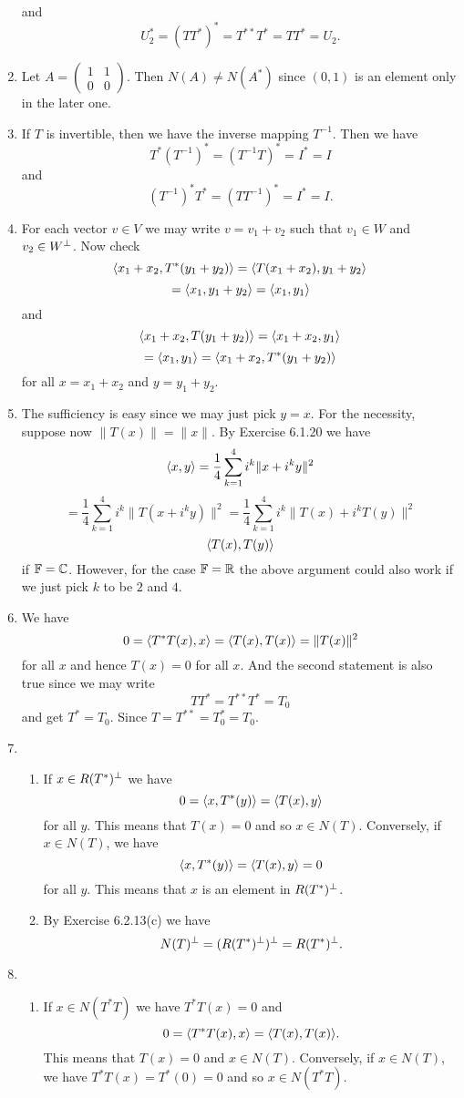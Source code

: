 \begin{enumerate}
and 
\[U_2^*=(TT^*)^*=T^{**}T^*=TT^*=U_2.\]
\item Let $A=\begin{pmatrix}1&1\\0&0\end{pmatrix}$. Then $N(A)\neq N(A^*)$ since $(0,1)$ is an element only in the later one.
\item If $T$ is invertible, then we have the inverse mapping $T^{-1}$. Then we have 
\[
    T^*(T^{-1})^*=(T^{-1}T)^*=I^*=I
\]
and  
\[
    (T^{-1})^*T^*=(TT^{-1})^*=I^*=I.
\]
\item For each vector $v\in V$ we may write $v=v_1+v_2$ such that $v_1\in W$ and $v_2\in W^{\perp}$. Now check 
\[\langle x_1+x_2,T^*(y_1+y_2)\rangle =\langle T(x_1+x_2),y_1+y_2\rangle \]
\[=\langle x_1,y_1+y_2\rangle =\langle x_1,y_1 \rangle \]
and 
\[\langle x_1+x_2,T(y_1+y_2)\rangle =\langle x_1+x_2,y_1\rangle \]
\[=\langle x_1,y_1\rangle =\langle x_1+x_2,T^*(y_1+y_2)\rangle \]
for all $x=x_1+x_2$ and $y=y_1+y_2$.
\item The sufficiency is easy since we may just pick $y=x$. For the necessity, suppose now $\|T(x)\|=\|x\|$. By Exercise 6.1.20 we have 
\[\langle x,y\rangle =\frac{1}{4}\sum_{k=1}^4{i^k\|x+i^ky\|^2}\]
\[=\frac{1}{4}\sum_{k=1}^4{i^k\|T(x+i^ky)\|^2}=\frac{1}{4}\sum_{k=1}^4{i^k\|T(x)+i^kT(y)\|^2}\]
\[\langle T(x),T(y)\rangle \]
if $\mathbb{F}=\mathbb{C}$. However, for the case $\mathbb{F}=\mathbb{R}$ the above argument could also work if we just pick $k$ to be $2$ and $4$.
\item We have 
\[0=\langle T^*T(x),x\rangle =\langle T(x),T(x)\rangle =\|T(x)\|^2\]
for all $x$ and hence $T(x)=0$ for all $x$. And the second statement is also true since we may write 
\[TT^*=T^{**}T^*=T_0\]
and get $T^*=T_0$. Since $T=T^{**}=T_0^*=T_0$.
\item \begin{enumerate}
\item If $x\in R(T^*)^{\perp}$ we have 
\[0=\langle x,T^*(y)\rangle =\langle T(x),y\rangle \]
for all $y$. This means that $T(x)=0$ and so $x\in N(T)$. Conversely, if $x\in N(T)$, we have 
\[\langle x,T^*(y)\rangle =\langle T(x),y\rangle =0\]
for all $y$. This means that $x$ is an element in $R(T^*)^{\perp}$.
\item By Exercise 6.2.13(c) we have 
\[N(T)^{\perp} =(R(T^*)^{\perp} )^{\perp} =R(T^*)^{\perp} .\]
\end{enumerate}
\item \begin{enumerate}
\item If $x\in N(T^*T)$ we have $T^*T(x)=0$ and 
\[0=\langle T^*T(x),x\rangle =\langle T(x),T(x)\rangle .\]
This means that $T(x)=0$ and $x\in N(T)$. Conversely, if $x\in N(T)$, we have $T^*T(x)=T^*(0)=0$ and so $x\in N(T^*T)$.


\end{enumerate}
\end{enumerate}
